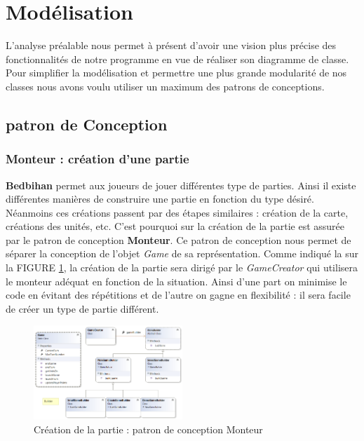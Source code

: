 \section{Modélisation}

	L'analyse préalable nous permet à présent d'avoir une vision plus précise des fonctionnalités de notre programme en vue de réaliser son diagramme de classe. Pour simplifier la modélisation et permettre une plus grande modularité de nos classes nous avons voulu utiliser un maximum des patrons de conceptions. 

	\subsection{patron de Conception}

		\subsubsection{Monteur : création d'une partie}

		\textbf{Bedbihan} permet aux joueurs de jouer différentes type de parties. Ainsi il existe différentes manières de construire une partie en fonction du type désiré. Néanmoins ces créations passent par des étapes similaires : création de la carte, créations des unités, etc. C'est pourquoi sur  la création de la partie est assurée par le patron de conception \textbf{Monteur}. Ce patron de conception nous permet de séparer la conception de l'objet \emph{Game} de sa représentation. Comme indiqué la sur la FIGURE \ref{fig:builder}, la création de la partie sera dirigé par le \emph{GameCreator} qui utilisera le monteur adéquat en fonction de la situation. Ainsi d'une part on minimise le code en évitant des répétitions et de l'autre on gagne en flexibilité : il sera facile de créer un type de partie différent. 

		\begin{figure}[h]
		\begin{center}
			\includegraphics[width=0.5\textwidth]{figure/builder.png}
		\end{center}
		\caption{Création de la partie : patron de conception Monteur}
		\label{fig:builder}
	\end{figure}

